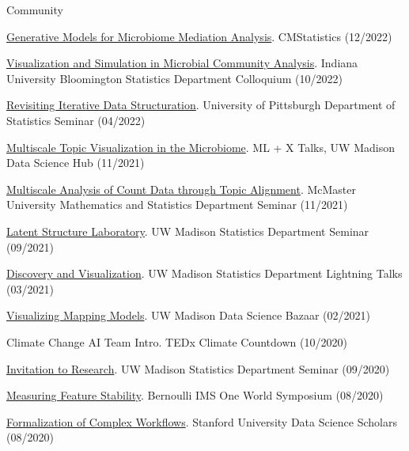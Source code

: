 \documentclass[letterpaper]{article}
\renewenvironment{itemize}{
  \begin{list}{}{
    \setlength{\leftmargin}{1.5em}
  }
}{
  \end{list}
}
\begin{document}
Community
\begin{itemize}
  \item \href{https://krisrs1128.github.io/talks/2022/20221217/20221217.html}{Generative Models for Microbiome Mediation Analysis}. CMStatistics (12/2022)
  \item \href{https://krisrs1128.github.io/talks/2022/20221021/20221021.html}{Visualization and Simulation in Microbial Community Analysis}. Indiana University Bloomington Statistics Department Colloquium (10/2022)
  \item \href{https://drive.google.com/file/d/1ju9f8e8aRb5OYLE28Ub0Pc6i2KCpcjgN/view?usp=sharing}{Revisiting Iterative Data Structuration}. University of Pittsburgh Department of Statistics Seminar (04/2022)
  \item \href{https://drive.google.com/file/d/14Lwhvd28sGEMSpw3AXZUsg8XXL25Gr4J/view?usp=sharing}{Multiscale Topic Visualization in the Microbiome}. ML + X Talks, UW Madison Data Science Hub (11/2021)
  \item \href{https://drive.google.com/file/d/1vcs_aLp6gZFixenGscrj6C5koEltxvGa/view?usp=sharing}{Multiscale Analysis of Count Data through Topic Alignment}. McMaster University Mathematics and Statistics Department Seminar (11/2021)
  \item \href{https://drive.google.com/file/d/1xwYyGc1bx7W-F5QyQlB3OJZT7MVTpdYd/view?usp=sharing}{Latent Structure Laboratory}. UW Madison Statistics Department Seminar (09/2021)
  \item \href{https://drive.google.com/drive/folders/16P8ZeKM1IEZFgCHgSxakUymamMZkNkTl}{Discovery and Visualization}. UW Madison Statistics Department Lightning Talks (03/2021)
  \item \href{https://krisrs1128.github.io/mapping-vis/}{Visualizing Mapping Models}. UW Madison Data Science Bazaar (02/2021)
  \item Climate Change AI Team Intro. TEDx Climate Countdown (10/2020)
  \item \href{https://drive.google.com/file/d/1xwYyGc1bx7W-F5QyQlB3OJZT7MVTpdYd/view?usp=sharing}{Invitation to Research}. UW Madison Statistics Department Seminar (09/2020)
  \item \href{https://www.youtube.com/watch?v=0W84gxCm83A}{Measuring Feature Stability}. Bernoulli IMS One World Symposium (08/2020)
  \item \href{https://drive.google.com/file/d/1mSRbA96aTuiIHSUmgfZKV788seF3X7p_/view?usp=sharing}{Formalization of Complex Workflows}. Stanford University Data Science Scholars (08/2020)

\end{itemize}
\end{document}
